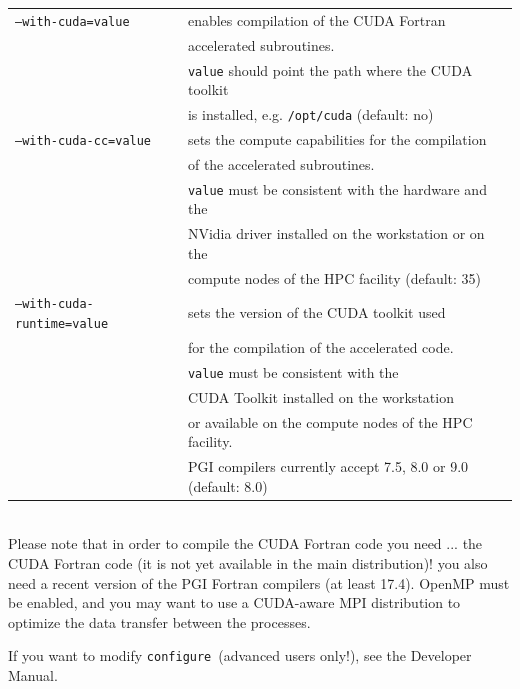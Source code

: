 \documentclass[12pt,a4paper]{article}
\def\configure{\texttt{configure}}
\begin{document}
\begin{tabular}{ll}
\texttt{--with-cuda=value}&         enables compilation of the CUDA Fortran\\
                          &         accelerated subroutines. \\
                          &         \texttt{value} should point the path where the CUDA toolkit \\
                          &         is installed, e.g. \texttt{/opt/cuda} (default: no)\\
\texttt{--with-cuda-cc=value}&      sets the compute capabilities for the compilation\\
                             &      of the accelerated subroutines. \\
                             &      \texttt{value} must be consistent with the hardware and the\\
                             &      NVidia driver installed on the workstation or on the\\
                             &      compute nodes of the HPC facility (default: 35)\\
\texttt{--with-cuda-runtime=value}& sets the version of the CUDA toolkit used \\
                                  & for the compilation of the accelerated code.\\
                                  & \texttt{value} must be consistent with the\\
                                  & CUDA Toolkit installed on the workstation \\
                                  & or available on the compute nodes of the HPC facility.\\
                                  & PGI compilers currently accept 7.5, 8.0 or 9.0 (default: 8.0)\\
\end{tabular}\\

Please note that in order to compile the CUDA Fortran code you need ...
the CUDA Fortran code (it is not yet available in the main distribution)! 
you also need a recent version of the PGI Fortran compilers (at least 17.4).
OpenMP must be enabled,
and you may want to use a CUDA-aware MPI distribution to optimize the data
transfer between the processes.

If you want to modify \configure\ (advanced users only!),
see the Developer Manual.
\end{document}
